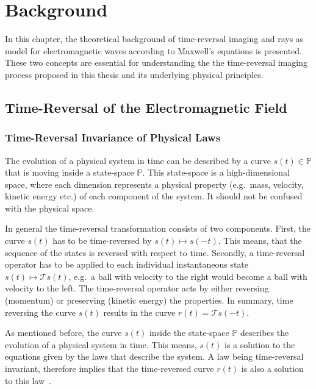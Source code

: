 
\chapter{Background}\label{chapter:background}
In this chapter, the theoretical background of time-reversal imaging and rays as model for electromagnetic waves according to Maxwell's equations is presented.
These two concepts are essential for understanding the the time-reversal imaging process proposed in this thesis and its underlying physical principles. 

\section{Time-Reversal of the Electromagnetic Field}
\subsection{Time-Reversal Invariance of Physical Laws}
The evolution of a physical system in time can be described by a curve \(s(t) \in \mathbb{P}\) that is moving inside a state-space \(\mathbb{P}\).
This state-space is a high-dimensional space, where each dimension represents a physical property (e.g.~mass, velocity, kinetic energy etc.) of each component of the system.
It should not be confused with the physical space.

In general the time-reversal transformation consists of two components\parencite{roberts_reversing_2022}.
First, the curve \(s(t)\) has to be time-reversed by \(s(t) \mapsto s(-t)\).
This means, that the sequence of the states is reversed with respect to time.
Secondly, a time-reversal operator has to be applied to each individual instantaneous state \(s(t) \mapsto \mathcal{T}s(t)\), e.g.\ a ball with velocity to the right would become a ball with velocity to the left.
The time-reversal operator acts by either reversing (momentum) or preserving (kinetic energy) the properties.
In summary, time reversing the curve \(s(t)\) results in the curve \(r(t)=\mathcal{T}s(-t)\). 

As mentioned before, the curve \(s(t)\) inside the state-space \(\mathbb{P}\) describes the evolution of a physical system in time.
This means, \(s(t)\) is a solution to the equations given by the laws that describe the system. 
A law being time-reversal invariant, therefore implies that the time-reversed curve \(r(t)\) is also a solution to this law~\parencite{roberts_time_2021}.

